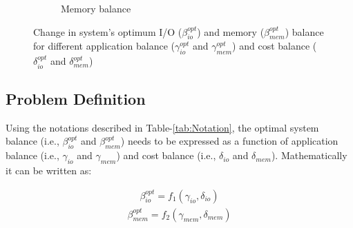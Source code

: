 \documentclass[journal]{IEEEtran}
\begin{document}
\begin{figure}[htb]
\begin{subfigure}[b]{0.48\textwidth}
                \caption{Memory balance}
                \label{fig:beta_mem}
   \end{subfigure}
   \caption{Change in system's optimum I/O ($\beta_{io}^{opt}$) and memory ($\beta_{mem}^{opt}$) balance for different application balance ($\gamma_{io}^{opt}$ and $\gamma_{mem}^{opt}$) and cost balance ($\delta_{io}^{opt}$ and $\delta_{mem}^{opt}$)}
  \label{fig:BetaVsGamma}
\end{figure}
\subsection{Problem Definition}
Using the notations described in Table-\ref{tab:Notation}, the optimal system balance (i.e., $\beta_{io}^{opt}$ and $\beta_{mem}^{opt}$) needs to be expressed as a function of application balance (i.e., $\gamma_{io}$ and $\gamma_{mem}$) and cost balance (i.e., $\delta_{io}$ and $\delta_{mem}$). Mathematically it can be written as:

\begin{equation} \label{eqn:BalancedIONotation}
\begin{split}
\beta_{io}^{opt} = f_1(\gamma_{io}, \delta_{io})
\end{split}
\end{equation}
\begin{equation} \label{eqn:BalancedMemNotation}
\begin{split}
\beta_{mem}^{opt} = f_2(\gamma_{mem}, \delta_{mem})
\end{split}
\end{equation}
\end{document}
